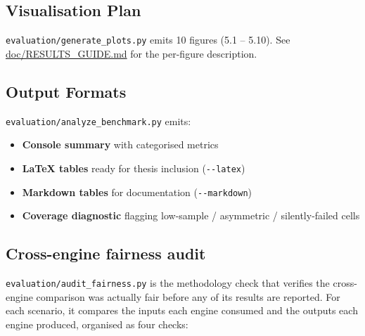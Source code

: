 \subsection{Visualisation Plan}\label{452-visualisation-plan}

\texttt{evaluation/generate\_plots.py} emits 10 figures (5.1 -- 5.10).
See \href{../RESULTS_GUIDE.md}{doc/RESULTS\_GUIDE.md} for the per-figure
description.

\subsection{Output Formats}\label{453-output-formats}

\texttt{evaluation/analyze\_benchmark.py} emits:

\begin{itemize}
\tightlist
\item
  \textbf{Console summary} with categorised metrics
\item
  \textbf{LaTeX tables} ready for thesis inclusion (\texttt{-\/-latex})
\item
  \textbf{Markdown tables} for documentation (\texttt{-\/-markdown})
\item
  \textbf{Coverage diagnostic} flagging low-sample / asymmetric /
  silently-failed cells
\end{itemize}

\begin{Shaded}
\begin{Highlighting}[]
  
\end{Highlighting}
\end{Shaded}

\subsection{Cross-engine fairness
audit}\label{454-cross-engine-fairness-audit}

\texttt{evaluation/audit\_fairness.py} is the methodology check that
verifies the cross-engine comparison was actually fair before any of its
results are reported. For each scenario, it compares the inputs each
engine consumed and the outputs each engine produced, organised as four
checks:

